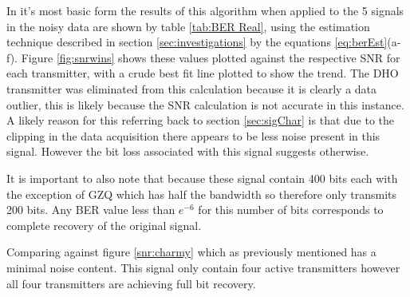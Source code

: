 In it's most basic form the results of this algorithm when applied to the 5 signals in the noisy data are shown by table \ref{tab:BER Real}, using the estimation technique described in section \ref{sec:investigations} by the equations \ref{eq:berEst}(a-f). Figure \ref{fig:snrwins} shows these values plotted against the respective SNR for each transmitter, with a crude best fit line plotted to show the trend. The DHO transmitter was eliminated from this calculation because it is clearly a data outlier, this is likely because the SNR calculation is not accurate in this instance. A likely reason for this referring back to section \ref{sec:sigChar} is that due to the clipping in the data acquisition there appears to be less noise present in this signal. However the bit loss associated with this signal suggests otherwise. 

It is important to also note that because these signal contain 400 bits each with the exception of GZQ which has half the bandwidth so therefore only transmits 200 bits. Any BER value less than $e^{-6}$ for this number of bits corresponds to complete recovery of the original signal.

Comparing against figure \ref{snr:charmy} which as previously mentioned has a minimal noise content. This signal only contain four active transmitters however all four transmitters are achieving full bit recovery.

